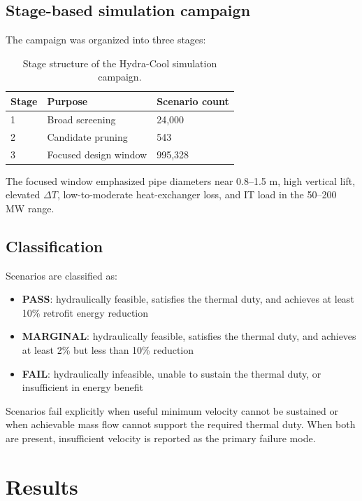 \documentclass[11pt]{article}
\begin{document}
\subsection{Stage-based simulation campaign}

The campaign was organized into three stages:

\begin{table}[h]
\centering
\begin{tabular}{lll}
\toprule
Stage & Purpose & Scenario count \\
\midrule
1 & Broad screening & 24,000 \\
2 & Candidate pruning & 543 \\
3 & Focused design window & 995,328 \\
\bottomrule
\end{tabular}
\caption{Stage structure of the Hydra-Cool simulation campaign.}
\end{table}

The focused window emphasized pipe diameters near 0.8--1.5 m, high vertical lift, elevated $\Delta T$, low-to-moderate heat-exchanger loss, and IT load in the 50--200 MW range.

\subsection{Classification}

Scenarios are classified as:

\begin{itemize}
  \item \textbf{PASS}: hydraulically feasible, satisfies the thermal duty, and achieves at least 10\% retrofit energy reduction
  \item \textbf{MARGINAL}: hydraulically feasible, satisfies the thermal duty, and achieves at least 2\% but less than 10\% reduction
  \item \textbf{FAIL}: hydraulically infeasible, unable to sustain the thermal duty, or insufficient in energy benefit
\end{itemize}

Scenarios fail explicitly when useful minimum velocity cannot be sustained or when achievable mass flow cannot support the required thermal duty. When both are present, insufficient velocity is reported as the primary failure mode.

\section{Results}
\end{document}
